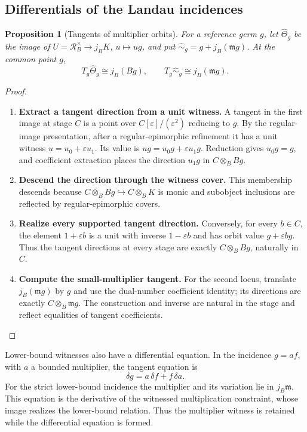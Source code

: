 \documentclass[11pt,a4paper]{article}
\numberwithin{algorithm}{section}
\numberwithin{equation}{section}
\newtheorem{proposition}[proposition]{Proposition}
\theoremstyle{definition}
\theoremstyle{remark}
\theoremstyle{plain}
\newcommand{\eps}{\varepsilon}
\newcommand{\Rline}{\mathcal R_B}
\theoremstyle{definition}
\theoremstyle{plain}
\begin{document}
\subsection{Differentials of the Landau incidences}
\begin{proposition}[Tangents of multiplier orbits]
\label{prop:orbit-tangents}
For a reference germ $g$, let $\widehat\Theta_g$ be the image
of $U=\Rline^\times\to j_BK$, $u\mapsto ug$, and put
$\widehat{\sim}_g=g+j_B(\mathfrak m g)$. At the common point $g$,
\begin{equation}\label{eq:orbit-tangents}
 T_g\widehat\Theta_g\cong j_B(Bg),\qquad
 T_g\widehat{\sim}_g\cong j_B(\mathfrak m g).
\end{equation}
\end{proposition}
\begin{proof}\leavevmode
\begin{enumerate}[leftmargin=*,align=left]
\item \textbf{Extract a tangent direction from a unit witness.}
A tangent in the first image at stage $C$ is a point over
$C[\eps]/(\eps^2)$ reducing to $g$. By the regular-image
presentation, after a regular-epimorphic refinement it has a unit
witness $u=u_0+\eps u_1$. Its value is
$ug=u_0g+\eps u_1g$. Reduction gives $u_0g=g$, and coefficient
extraction places the direction $u_1g$ in $C\otimes_BBg$.

\item \textbf{Descend the direction through the witness cover.}
This membership descends because $C\otimes_BBg\hookrightarrow
C\otimes_BK$ is monic and subobject inclusions are reflected by
regular-epimorphic covers.

\item \textbf{Realize every supported tangent direction.}
Conversely, for every
$b\in C$, the element $1+\eps b$ is a unit with inverse
$1-\eps b$ and has orbit value $g+\eps bg$.
Thus the tangent directions at every stage are exactly
$C\otimes_BBg$, naturally in $C$.

\item \textbf{Compute the small-multiplier tangent.}
For the second locus, translate
$j_B(\mathfrak m g)$ by $g$ and use the dual-number coefficient
identity; its directions are exactly $C\otimes_B\mathfrak m g$.
The construction and inverse are natural in the stage and reflect
equalities of tangent coefficients.
\end{enumerate}
\end{proof}

Lower-bound witnesses also have a differential equation.
In the incidence $g=af$, with $a$ a bounded multiplier,
the tangent equation is
\[
 \delta g=a\,\delta f+f\,\delta a.
\]
For the strict lower-bound incidence the multiplier and its
variation lie in $j_B\mathfrak m$.
This equation is the derivative of the witnessed multiplication
constraint, whose image realizes the lower-bound relation.
Thus the multiplier witness is retained while the differential
equation is formed.
\end{document}
